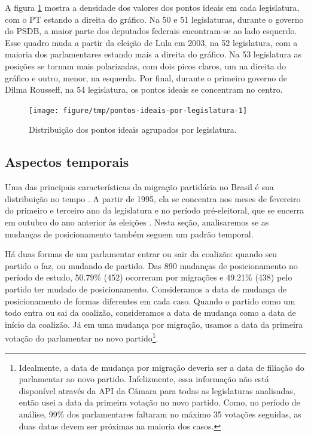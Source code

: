 \documentclass[a4paper,titlepage]{ppgi}\usepackage[]{graphicx}\usepackage[]{color}
\newenvironment{knitrout}{}{} %
\begin{document}
A figura \ref{fig:pontos-ideais-por-legislatura} mostra a densidade dos valores
dos pontos ideais em cada legislatura, com o PT estando a direita do gráfico.
Na 50\textordfeminine{} e 51\textordfeminine{} legislaturas, durante o governo
do PSDB, a maior parte dos deputados federais encontram-se ao lado esquerdo.
Esse quadro muda a partir da eleição de Lula em 2003, na 52\textordfeminine{}
legislatura, com a maioria dos parlamentares estando mais a direita do gráfico.
Na 53\textordfeminine{} legislatura as posições se tornam mais polarizadas, com
dois picos claros, um na direita do gráfico e outro, menor, na esquerda. Por
final, durante o primeiro governo de Dilma Rousseff, na 54\textordfeminine{}
legislatura, os pontos ideais se concentram no centro.

\begin{knitrout}
\color{fgcolor}\begin{figure}
\texttt{[image: figure/tmp/pontos-ideais-por-legislatura-1]} \caption[Distribuição dos pontos ideais agrupados por legislatura]{Distribuição dos pontos ideais agrupados por legislatura.}\label{fig:pontos-ideais-por-legislatura}
\end{figure}


\end{knitrout}

\subsection{Aspectos temporais}
\label{cap:desenvolvimento:aspectos-temporais}



Uma das principais características da migração partidária no Brasil é sua
distribuição no tempo \cite{Araujo2000,Melo2004,Freitas2008}. A partir de 1995,
ela se concentra nos meses de fevereiro do primeiro e terceiro ano da
legislatura e no período pré-eleitoral, que se encerra em outubro do ano
anterior às eleições \cite{Freitas2008,Lei9504/1997}. Nesta seção,
analisaremos se as mudanças de posicionamento também seguem um padrão temporal.

Há duas formas de um parlamentar entrar ou sair da coalizão: quando seu partido
o faz, ou mudando de partido. Das 890 mudanças de
posicionamento no período de estudo,
50.79\% (452)
ocorreram por migrações e
49.21\% (438)
pelo partido ter mudado de posicionamento. Consideramos a data de mudança
de posicionamento de formas diferentes em cada caso. Quando o partido como um
todo entra ou sai da coalizão, consideramos a data de mudança como a data de
início da coalizão. Já em uma mudança por migração, usamos a data da primeira
votação do parlamentar no novo partido\footnote{Idealmente, a data de mudança
por migração deveria ser a data de filiação do parlamentar ao novo partido.
Infelizmente, essa informação não está disponível através da \gls{API} da
Câmara para todas as legislaturas analisadas, então usei a data da primeira
votação no novo partido. Como, no período de análise, 99\% dos parlamentares
faltaram no máximo 35 votações seguidas, as duas datas devem ser próximas na
maioria dos casos.}.
\end{document}
